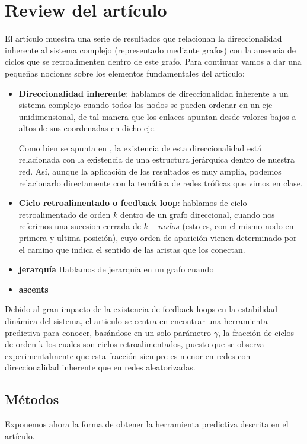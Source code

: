 \documentclass[1p]{elsarticle}
\begin{document}
\section{Review del artículo}
El artículo muestra una serie de resultados que relacionan la direccionalidad inherente al sistema complejo (representado mediante grafos) con la ausencia de ciclos que se retroalimenten dentro de este grafo. 
Para continuar vamos a dar una pequeñas nociones sobre los elementos fundamentales del articulo:
\begin{itemize}
	\item \textbf{Direccionalidad inherente}: hablamos de direccionalidad inherente a un sistema complejo cuando todos los nodos se pueden ordenar en un eje unidimensional, de tal manera que los enlaces apuntan desde valores bajos a altos de sus coordenadas en dicho eje. 
	
	Como bien se apunta en \cite{arti}, la existencia de esta direccionalidad está relacionada con la existencia de una estructura jerárquica dentro de nuestra red. Así, aunque la aplicación de los resultados es muy amplia, podemos relacionarlo directamente con la temática de redes tróficas que vimos en clase. 
	\item \textbf{Ciclo retroalimentado o feedback loop}: hablamos de ciclo retroalimentado de orden $k$ dentro de un grafo direccional, cuando nos referimos una sucesion cerrada de $k-nodos$ (esto es, con el mismo nodo en primera y ultima posición), cuyo orden de aparición vienen determinado por el camino que indica el sentido de las aristas que los conectan.
	\item \textbf{jerarquía} Hablamos de jerarquía en un grafo cuando 
	\item \textbf{ascents}
\end{itemize}

Debido al gran impacto de la existencia de feedback loops en la estabilidad dinámica del sistema, el articulo se centra en encontrar una herramienta predictiva para conocer, basándose en un solo parámetro $\gamma$, la fracción de ciclos de orden k los cuales son ciclos retroalimentados, puesto que se observa experimentalmente que esta fracción siempre es menor en redes con direccionalidad inherente que en redes aleatorizadas.

\subsection{Métodos}
Exponemos ahora la forma de obtener la herramienta predictiva descrita en el artículo.
\end{document}
